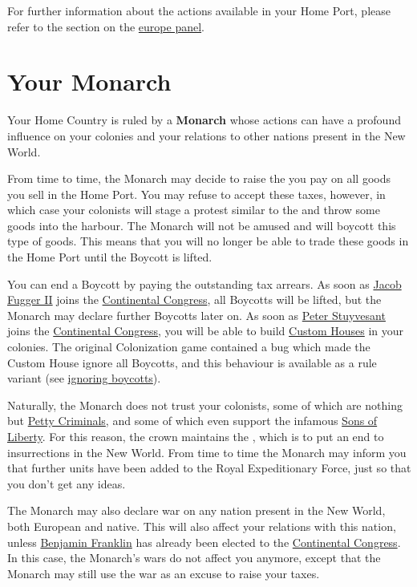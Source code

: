 \documentclass[12pt]{book}
\begin{document}
For further information about the actions available in your Home Port,
please refer to the section on the \hyperlink{europe panel}{europe panel}.


\hypertarget{Monarch}{\section{Your Monarch}}

Your Home Country is ruled by a \textbf{Monarch} whose actions can
have a profound influence on your colonies and your relations to other
nations present in the New World.

From time to time, the Monarch may decide to raise the
 you pay on all goods you sell in the Home
Port. You may refuse to accept these taxes, however, in which case
your colonists will stage a protest similar to the  and throw some goods into the harbour. The Monarch will not be
amused and will  \hypertarget{Boycotts}{boycott} this
type of goods. This means that you will no longer be able to trade
these goods in the Home Port until the Boycott is lifted.

You can end a Boycott by paying the outstanding tax arrears. As soon
as \hyperlink{Jacob Fugger II}{Jacob Fugger II} joins the
\hyperlink{Continental Congress}{Continental Congress}, all Boycotts
will be lifted, but the Monarch may declare further Boycotts later
on. As soon as \hyperlink{Peter Stuyvesant}{Peter Stuyvesant} joins
the \hyperlink{Continental Congress}{Continental Congress}, you will
be able to build \hyperlink{Custom House}{Custom Houses} in your
colonies. The original Colonization game contained a bug which made
the Custom House ignore all Boycotts, and this behaviour is available
as a rule variant (see \hyperlink{ignore boycotts}{ignoring boycotts}).

Naturally, the Monarch does not trust your colonists, some of which
are nothing but \hyperlink{Petty Criminal}{Petty Criminals}, and some
of which even support the infamous \hyperlink{Sons of Liberty}{Sons of
Liberty}. For this reason, the crown maintains the
, which is to put an end to
insurrections in the New World. From time to time the Monarch may
inform you that further units have been added to the Royal
Expeditionary Force, just so that you don't get any ideas.

The Monarch may also declare war on any nation present in the New
World, both European and native. This will also affect your relations
with this nation, unless \hyperlink{Benjamin Franklin}{Benjamin
Franklin} has already been elected to the \hyperlink{Continental
Congress}{Continental Congress}. In this case, the Monarch's wars do
not affect you anymore, except that the Monarch may still use the war
as an excuse to raise your taxes.
\end{document}
